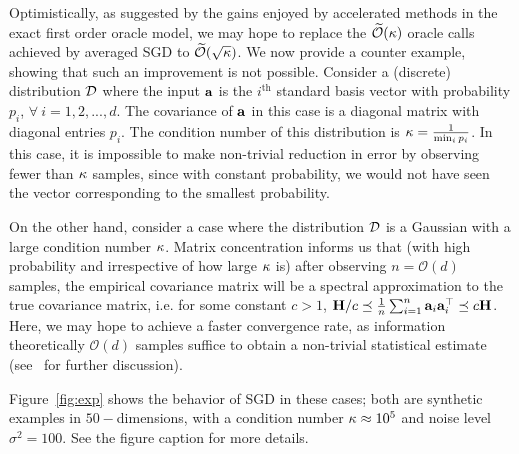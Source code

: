 Optimistically, as suggested by the gains enjoyed by accelerated methods in the exact first order oracle model, we may hope to replace the $\widetilde{\mathcal{O}}({\kappa})$ oracle calls achieved by averaged SGD to $\widetilde{\mathcal{O}}(\sqrt{{\kappa}})$.  We now provide a counter example, showing that such an improvement is not possible. Consider a (discrete) distribution $\mathcal{D}$ where the input $\mathbf{a}$ is the $i^{\textrm{th}}$ standard basis vector with probability $p_i$, $\forall\ i=1,2,...,d$. The covariance of $\mathbf{a}$ in this case is a diagonal matrix with diagonal entries $p_i$. The condition number of this distribution is ${\kappa} = \frac{1}{\min_i p_{i}}$. In this case, it is impossible to
make non-trivial reduction in error by observing fewer than ${\kappa}$ samples, since with constant probability, we would not have seen the vector corresponding to the smallest probability. 

On the other hand, consider a case where the distribution $\mathcal{D}$ is a
Gaussian with a large condition number ${\kappa}$. Matrix concentration
informs us that (with high probability and irrespective of how large ${\kappa}$ is) after observing
$n=\mathcal{O}(d)$ samples, the empirical covariance matrix will be a spectral approximation to the true covariance
matrix, i.e. for some constant $c>1$,
$\mathbf{H}/c \preceq \frac{1}{n}\sum_{i=1}^n \mathbf{a}_i\mathbf{a}_i^{\top} \preceq c \mathbf{H}$.
Here, we may hope to achieve a faster convergence rate, as information
theoretically $\mathcal{O}(d)$ samples suffice to obtain a non-trivial
statistical estimate (see~\cite{HsuKZ14} for further discussion).

Figure~\ref{fig:exp} shows the behavior of SGD in these cases;
both are synthetic examples in $50-$dimensions, with a condition
number ${\kappa}\approx 10^5$ and noise level $\sigma^2=100$. See the figure caption for more details. 


